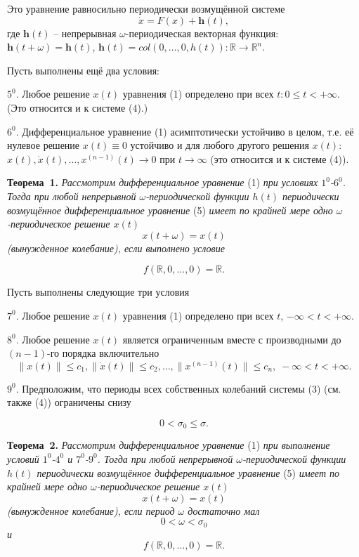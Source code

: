{{Это уравнение равносильно периодически возмущённой системе
$$\dot{x}=F(x)+\mathbf{h}(t),$$
где $\mathbf{h}(t)$ -- непрерывная $\omega$-периодическая векторная функция:
$\mathbf{h}(t+\omega)=\mathbf{h}(t)$,
$\mathbf{h}(t)=col(0,\ldots, 0,h(t)):\mathbb{ R}\rightarrow \mathbb{ R}^n$.

Пусть выполнены ещё  два условия:

$5^0$. Любое решение $x(t)$ уравнения (1)  определено при всех $t:0\leqslant t< +\infty$.
(Это относится и к системе (4).)

$6^0$. Дифференциальное уравнение (1) асимптотически устойчиво в целом, т.е. её нулевое решение
$x(t)\equiv 0$ устойчиво и для любого другого решения $x(t)$:
$x(t), \dot x(t),\ldots , x^{(n-1)}(t)\rightarrow 0$ при  $t\rightarrow\infty$ (это относится и к системе (4)).

\textbf{Теорема~1.} {\it Рассмотрим дифференциальное уравнение} (1) {\it при условиях $1^0$-$6^0$. Тогда
	при любой непрерывной $\omega$-пе\-ри\-о\-ди\-чес\-кой функции  $h(t)$ периодически возмущённое дифференциальное
	уравнение} (5) {\it имеет по крайней мере одно $\omega$-периодическое решение  $x(t)$
		$$x(t+\omega)=x(t)$$
	(вынужденное колебание), если выполнено условие}

$$f(\mathbb{ R},0,\ldots,0)=\mathbb{ R}.$$



Пусть выполнены следующие три условия

$7^0$. Любое решение $x(t)$ уравнения (1) определено при всех $t$, $-\infty<t<+\infty$.

$8^0$. Любое решение $x(t)$ является ограниченным вместе с производными до $(n-1)$-го порядка включительно
$$\|x(t)\|\leqslant c_1, \|\dot{x}(t)\|\leqslant c_2, \ldots, \|x^{(n-1)}(t)\|\leqslant c_n,\;  -\infty<t<+\infty.$$

$9^0$. Предположим, что периоды всех собственных колебаний системы (3) (см. также (4)) ограничены снизу

$$ 0<\sigma_0 \leqslant \sigma. $$

\textbf{Теорема~2.} {\it Рассмотрим дифференциальное уравнение} (1) {\it при выполнение условий $1^0$-$4^0$ и $7^0$-$9^0$. Тогда
	при любой непрерывной  $\omega$-периодической функции  $h(t)$  периодически возмущённое дифференциальное
	уравнение} (5) {\it имеет по крайней мере одно $\omega$-периодическое решение  $x(t)$
		$$x(t+\omega)=x(t) $$
	(вынужденное колебание), если период $\omega$ достаточно мал
		$$0<\omega< \sigma_0 $$
	и}
$$f(\mathbb{ R},0,\ldots,0)=\mathbb{ R}.$$

}}

